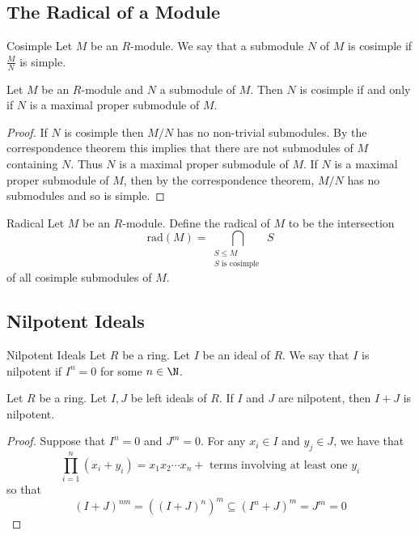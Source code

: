 \documentclass[a4paper]{article}
\begin{document}
\subsection{The Radical of a Module}
\begin{defn}{Cosimple}{} Let $M$ be an $R$-module. We say that a submodule $N$ of $M$ is cosimple if $\frac{M}{N}$ is simple. 
\end{defn}

\begin{lmm}{}{} Let $M$ be an $R$-module and $N$ a submodule of $M$. Then $N$ is cosimple if and only if $N$ is a maximal proper submodule of $M$. \tcbline
\begin{proof}
If $N$ is cosimple then $M/N$ has no non-trivial submodules. By the correspondence theorem this implies that there are not submodules of $M$ containing $N$. Thus $N$ is a maximal proper submodule of $M$. If $N$ is a maximal proper submodule of $M$, then by the correspondence theorem, $M/N$ has no submodules and so is simple. 
\end{proof}
\end{lmm}

\begin{defn}{Radical}{} Let $M$ be an $R$-module. Define the radical of $M$ to be the intersection $$\text{rad}(M)=\bigcap_{\substack{S\leq M\\S\text{ is cosimple }}}S$$ of all cosimple submodules of $M$. 
\end{defn}

\subsection{Nilpotent Ideals}
\begin{defn}{Nilpotent Ideals}{} Let $R$ be a ring. Let $I$ be an ideal of $R$. We say that $I$ is nilpotent if $I^n=0$ for some $n\in\N$. 
\end{defn}

\begin{prp}{}{} Let $R$ be a ring. Let $I,J$ be left ideals of $R$. If $I$ and $J$ are nilpotent, then $I+J$ is nilpotent. \tcbline
\begin{proof}
Suppose that $I^n=0$ and $J^m=0$. For any $x_i\in I$ and $y_j\in J$, we have that $$\prod_{i=1}^n(x_i+y_i)=x_1x_2\cdots x_n+\text{ terms involving at least one }y_i$$ so that $$(I+J)^{nm}=((I+J)^n)^m\subseteq(I^n+J)^m=J^m=0$$
\end{proof}
\end{prp}
\end{document}
